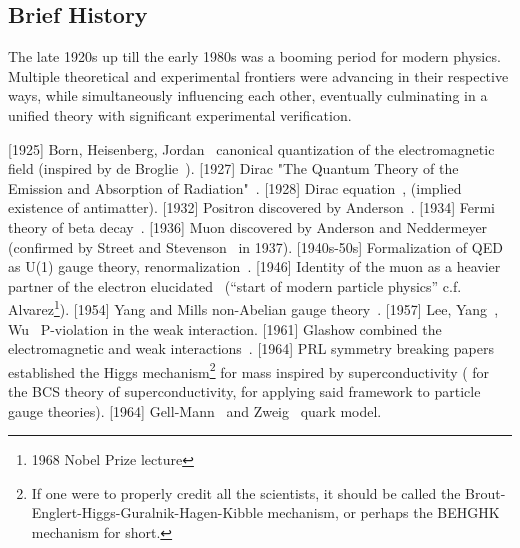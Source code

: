 \subsection{Brief History}
The late 1920s up till the early 1980s was a booming period for modern physics.
Multiple theoretical and experimental frontiers were advancing in their respective ways,
while simultaneously influencing each other,
eventually culminating in a unified theory with significant experimental verification.

[1925] Born, Heisenberg, Jordan~\cite{BornJordan1925Quantization, BornHeisenbergJordan1926Quantization} canonical quantization of the electromagnetic field (inspired by de Broglie~\cite{DeBroglie1925Quantization}).
[1927] Dirac "The Quantum Theory of the Emission and Absorption of Radiation"~\cite{Dirac1927QED}.
[1928] Dirac equation~\cite{Dirac1928DiracEquation}, (implied existence of antimatter).
[1932] Positron discovered by Anderson~\cite{Anderson1933Positron}.
[1934] Fermi theory of beta decay~\cite{Fermi1934BetaDecay}.
[1936] Muon discovered by Anderson and Neddermeyer~\cite{AndersonNeddermeyer1936Muon} (confirmed by Street and Stevenson~\cite{StreetStevenson1937Muon} in 1937).
[1940s-50s] Formalization of QED as U(1) gauge theory, renormalization~\cite{Tomonaga1946QED, Schwinger1948QED-1, Schwinger1948QED-2, Feynmann1949QED-1, Feynmann1949QED-2, Feynmann1950QED-3, Dyson1949QED-1, Dyson1949QED-2}.
[1946] Identity of the muon as a heavier partner of the electron elucidated~\cite{ConversiPanciniPiccioni1947Muon} (``start of modern particle physics'' c.f. Alvarez\footnote{1968 Nobel Prize lecture}).
[1954] Yang and Mills non-Abelian gauge theory~\cite{YanMills1954NonAbelianGaugeTheory}.
[1957] Lee, Yang~\cite{LeeYang1956ParityViolation}, Wu~\cite{WuEtAl1957ParityViolation} P-violation in the weak interaction.
[1961] Glashow combined the electromagnetic and weak interactions~\cite{Glashow1961Electroweak}.
[1964] PRL symmetry breaking papers~\cite{BroutEnglert1964HiggsMechanism, Higgs1964HiggsMechanism, GHK1964HiggsMechanism} established the Higgs mechanism\footnote{
  If one were to properly credit all the scientists, it should be called the 
  Brout-Englert-Higgs-Guralnik-Hagen-Kibble mechanism, 
  or perhaps the BEHGHK mechanism for short.} 
for mass inspired by superconductivity (\cite{BCS1957Superconductivity} for the BCS theory of superconductivity, \cite{Anderson1963SSB, KleinLee1964SSB} for applying said framework to particle gauge theories).
[1964] Gell-Mann~\cite{GellMann1964QuarkModel} and Zweig~\cite{Zweig1964QuarkModel} quark model.
